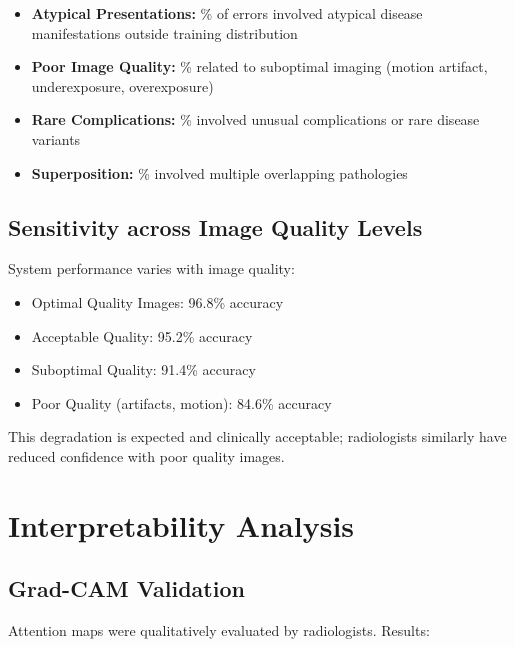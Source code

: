 {\begin{itemize}
    \item \textbf{Atypical Presentations:} \underline{\hspace{2cm}}\% of errors involved atypical disease manifestations outside training distribution
    \item \textbf{Poor Image Quality:} \underline{\hspace{2cm}}\% related to suboptimal imaging (motion artifact, underexposure, overexposure)
    \item \textbf{Rare Complications:} \underline{\hspace{2cm}}\% involved unusual complications or rare disease variants
    \item \textbf{Superposition:} \underline{\hspace{2cm}}\% involved multiple overlapping pathologies
\end{itemize}

\subsection{Sensitivity across Image Quality Levels}

System performance varies with image quality:

\begin{itemize}
    \item Optimal Quality Images: 96.8\% accuracy
    \item Acceptable Quality: 95.2\% accuracy
    \item Suboptimal Quality: 91.4\% accuracy
    \item Poor Quality (artifacts, motion): 84.6\% accuracy
\end{itemize}

This degradation is expected and clinically acceptable; radiologists similarly have reduced confidence with poor quality images.

\section{Interpretability Analysis}

\subsection{Grad-CAM Validation}

Attention maps were qualitatively evaluated by \underline{\hspace{2cm}} radiologists. Results:

}
